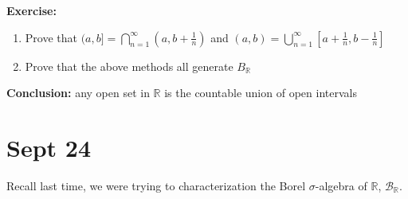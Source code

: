 \documentclass[12pt]{report}
\newcommand{\R}{\mathbb{R}}
\newcommand{\B}{\mathcal{B}}
\newenvironment*{exercise}[1][red]{
    \begin{tcolorbox}[
        parbox=false,
        colback=#1!5!white,
        colframe=#1!75!black,
        breakable
    ]}
    {\end{tcolorbox}}
\begin{document}
        \begin{exercise}
            \textbf{Exercise:} 
            \begin{enumerate}
                \item Prove that $(a, b] = \bigcap_{n=1}^{\infty} (a, b + \frac{1}{n})$ and $(a, b) = \bigcup_{n=1}^{\infty} [a + \frac{1}{n}, b - \frac{1}{n}]$
                \item Prove that the above methods all generate $B_{\R}$ 
            \end{enumerate}
        \end{exercise}

        \textbf{Conclusion:} any open set in $\R$ is the countable union of open intervals

\section*{Sept 24}
    Recall last time, we were trying to characterization the Borel $\sigma$-algebra of $\R$, $\B_{\R}$. 
\end{document}

